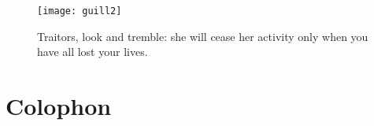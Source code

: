 \documentclass[
a5paper,
BCOR=7mm,
twoside,
DIV=calc,
12pt,
usegeometry,
chapterprefix,
endperiod,
headings=big]{scrbook}
\newcommand{\moderatelyhuge}{\fontsize{50}{60}\selectfont}
\renewcommand*{\chaptermarkformat}{}
\renewcommand*{\chaptermarkformat}{%

\chapapp~\thechapter\autodot\enskip}
\begin{document}

\renewcommand*{\chapterpagestyle}{empty}


\tableofcontents
\thispagestyle{empty}
\clearpage

{\headsep=0pt
\headheight=20pt
\vfill
\begin{figure}[p!]
\centering
\texttt{[image: guill2]}
\caption{Traitors, look and tremble: she will cease her activity only when you have all lost your lives.}
\label{guillotine}
\end{figure}
\vfill
\thispagestyle{empty}
\clearpage}


\pagestyle{headings}
\renewcommand*{\chapterpagestyle}{plain}


\renewcommand*{\chaptermarkformat}{}

\headsep=10pt
\headheight=45pt
\footskip=30pt


































\chapter*{Colophon}
\end{document}
